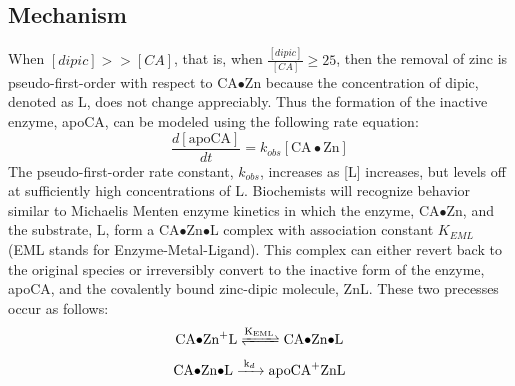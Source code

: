 \subsection{Mechanism}
When $[dipic] >> [CA]$, that is, when $\frac{[dipic]}{[CA]} \ge 25$, then the removal of zinc is pseudo-first-order with respect to CA$\bullet$Zn because the concentration of dipic, denoted as L, does not change appreciably. Thus the formation of the inactive enzyme, apoCA, can be modeled using the following rate equation:
\begin{equation}\label{eqn:a}
\frac{d[\text{apoCA}]}{dt}=k_{obs}[\text{CA$\bullet$Zn}]
\end{equation}
The pseudo-first-order rate constant, $k_{obs}$, increases as [L] increases, but levels off at sufficiently high concentrations of L. Biochemists will recognize behavior similar to Michaelis Menten enzyme kinetics in which the enzyme, CA$\bullet$Zn, and the substrate, L, form a CA$\bullet$Zn$\bullet$L complex with association constant $K_{EML}$ (EML stands for Enzyme-Metal-Ligand). This complex can either revert back to the original species or irreversibly convert to the inactive form of the enzyme, apoCA, and the covalently bound zinc-dipic molecule, ZnL. These two precesses occur as follows:
\begin{align}\label{eqn:KEML_reaction}
\ce{CA$\bullet$Zn+L
<=>[\ce{K_{EML}}]
CA$\bullet$Zn$\bullet$L}
\end{align}
\begin{align}\label{eqn:kd_reaction}
\ce{CA$\bullet$Zn$\bullet$L
->[\ce{k_{d}}]
apoCA+ZnL}
\end{align}